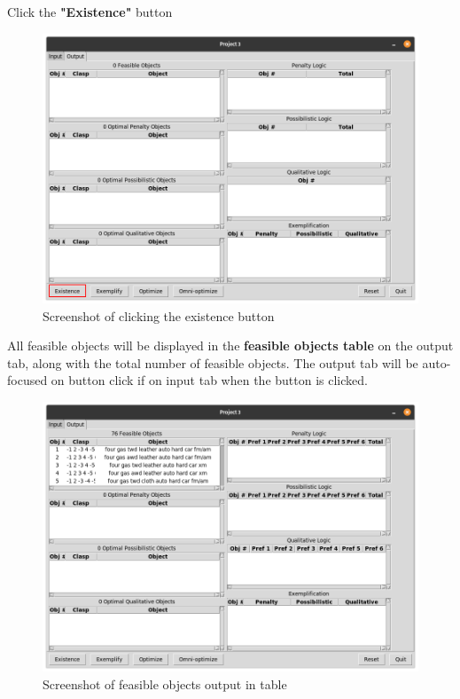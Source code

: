 \documentclass[12pt]{report}
\begin{document}
\begin{description}[leftmargin=4em]
\item [Step 1:] Click the \textbf{"Existence"} button
\begin{figure}[H]
\begin{center}
\includegraphics[scale=0.3,trim=1cm 1cm 1cm 1cm]{existence}
\caption{Screenshot of clicking the existence button}
\end{center}
\end{figure}
\vspace{-2.5em}
\item [Result:] All feasible objects will be displayed in the \textbf{feasible objects table} on the output tab, along with the total number of feasible objects. The output tab will be auto-focused on button click if on input tab when the button is clicked.
\begin{figure}[H]
\begin{center}
\includegraphics[scale=0.275,trim=1cm 1cm 1cm 1cm]{post_existence}
\caption{Screenshot of feasible objects output in table}
\end{center}
\end{figure}
\vspace{-2.5em}
\end{description}
\end{document}
